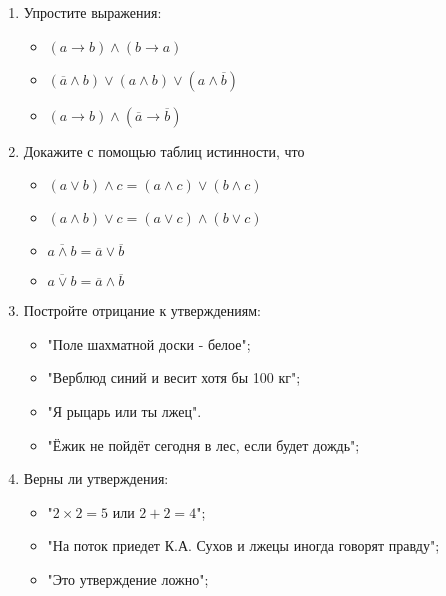 \documentclass{article}
\begin{document}
\begin{enumerate}[label*=\protect\fbox{\arabic{enumi}}]
\begin{itemize}
	\end{itemize} 
	
	\item Упростите выражения:
	\begin{itemize}
		
		\item $(a \rightarrow b) \wedge (b \rightarrow a)$
		
		\item $(\overline{a} \wedge b) \vee  (a \wedge b) \vee  (a \wedge \overline{b})$
		
		\item $(a \rightarrow b) \wedge (\overline{a} \rightarrow \overline{b})$
		
	\end{itemize} 
	
	\item Докажите с помощью таблиц истинности, что  
	\begin{itemize}
		
		\item $(a \vee b) \wedge c = (a \wedge c) \vee (b \wedge c)$
		
		\item  $(a \wedge b) \vee c = (a \vee c) \wedge (b \vee c)$
		
		\item  $\overline{a \wedge b}= \overline{a} \vee \overline{b}$
		
		\item  $\overline{a \vee b}= \overline{a} \wedge \overline{b}$
		
	\end{itemize} 
	
	\item Постройте отрицание к утверждениям:
	\begin{itemize}
		\item "Поле шахматной доски - белое";
		
		\item "Верблюд синий и весит хотя бы 100 кг";
		
		\item "Я рыцарь или ты лжец".
		
		\item "Ёжик не пойдёт сегодня в лес, если будет дождь";
	\end{itemize}
	
	\item Верны ли утверждения:
	\begin{itemize}
		\item "$2 \times 2 = 5$ или $2 + 2 = 4$";
		
		\item "На поток приедет К.А. Сухов и лжецы иногда говорят правду";
		
		\item "Это утверждение ложно";
	\end{itemize}

\end{enumerate}
\end{document}
